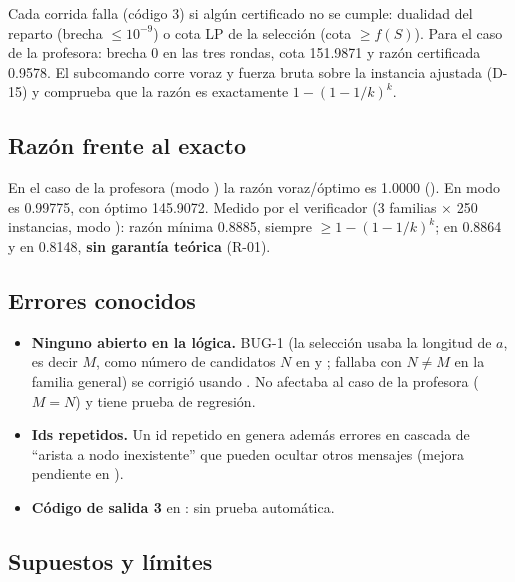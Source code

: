 \documentclass[11pt,a4paper]{article}
\begin{document}
Cada corrida falla (código 3) si algún certificado no se cumple: dualidad del reparto (brecha $\le 10^{-9}$) o cota LP de la selección (cota $\ge f(S)$). Para el caso de la profesora: brecha 0 en las tres rondas, cota 151.9871 y razón certificada 0.9578. El subcomando  corre voraz y fuerza bruta sobre la instancia ajustada (D-15) y comprueba que la razón es exactamente $1-(1-1/k)^k$.

\subsection{Razón frente al exacto}

En el caso de la profesora (modo ) la razón voraz/óptimo es 1.0000 (). En modo  es 0.99775, con óptimo 145.9072. Medido por el verificador (3 familias $\times$ 250 instancias, modo ): razón mínima 0.8885, siempre $\ge 1-(1-1/k)^k$; en  0.8864 y en  0.8148, \textbf{sin garantía teórica} (R-01).

\subsection{Errores conocidos}

\begin{itemize}[leftmargin=*]
\item \textbf{Ninguno abierto en la lógica.} BUG-1 (la selección usaba la longitud de $a$, es decir $M$, como número de candidatos $N$ en  y ; fallaba con $N\neq M$ en la familia general) se corrigió usando . No afectaba al caso de la profesora ($M=N$) y tiene prueba de regresión.
\item \textbf{Ids repetidos.} Un id repetido en  genera además errores en cascada de ``arista a nodo inexistente'' que pueden ocultar otros mensajes (mejora pendiente en ).
\item \textbf{Código de salida 3} en : sin prueba automática.
\end{itemize}

\subsection{Supuestos y límites}
\end{document}
